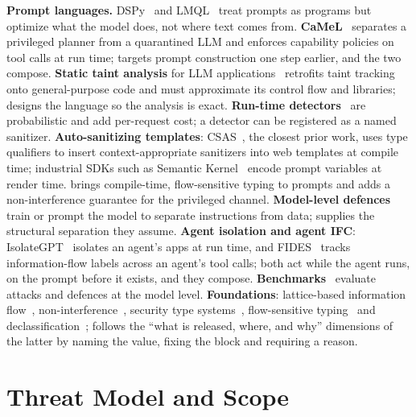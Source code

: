 \documentclass[journal]{IEEEtran}
\begin{document}
\textbf{Prompt languages.} DSPy~\cite{khattab2024dspy} and LMQL~\cite{beurer2023lmql} treat prompts as programs but optimize what the model does, not where text comes from. \textbf{CaMeL}~\cite{debenedetti2025camel} separates a privileged planner from a quarantined LLM and enforces capability policies on tool calls at run time; \TL{} targets prompt construction one step earlier, and the two compose. \textbf{Static taint analysis} for LLM applications~\cite{he2026taintp2x} retrofits taint tracking onto general-purpose code and must approximate its control flow and libraries; \TL{} designs the language so the analysis is exact. \textbf{Run-time detectors}~\cite{jacob2024promptshield,rebedea2023nemo} are probabilistic and add per-request cost; a detector can be registered as a named \TL{} sanitizer. \textbf{Auto-sanitizing templates}: CSAS~\cite{samuel2011csas}, the closest prior work, uses type qualifiers to insert context-appropriate sanitizers into web templates at compile time; industrial SDKs such as Semantic Kernel~\cite{microsoft2024sk} encode prompt variables at render time. \TL{} brings compile-time, flow-sensitive typing to prompts and adds a non-interference guarantee for the privileged channel. \textbf{Model-level defences}~\cite{wallace2024hierarchy,chen2025struq,chen2024secalign,piet2024jatmo,hines2024spotlighting} train or prompt the model to separate instructions from data; \TL{} supplies the structural separation they assume. \textbf{Agent isolation and agent IFC}: IsolateGPT~\cite{wu2025isolategpt} isolates an agent's apps at run time, and FIDES~\cite{costa2025fides} tracks information-flow labels across an agent's tool calls; both act while the agent runs, \TL{} on the prompt before it exists, and they compose. \textbf{Benchmarks}~\cite{toyer2024tensortrust,liu2024formalizing} evaluate attacks and defences at the model level. \textbf{Foundations}: lattice-based information flow~\cite{denning1976lattice}, non-interference~\cite{goguen1982security}, security type systems~\cite{volpano1996sound,sabelfeld2003language}, flow-sensitive typing~\cite{hunt2006flow} and declassification~\cite{sabelfeld2009declassification};  follows the ``what is released, where, and why'' dimensions of the latter by naming the value, fixing the block and requiring a reason.

\section{Threat Model and Scope}\label{sec:threat}
\end{document}
